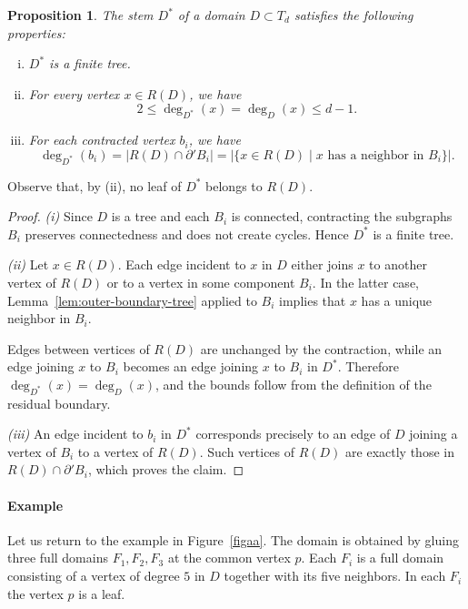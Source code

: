\documentclass[a4paper, 11pt]{article}
\numberwithin{equation}{section}
\newtheorem{proposition}[theorem]{Proposition}
\theoremstyle{definition}
\theoremstyle{remark}
\begin{document}
\begin{proposition}\label{prop.stemproperties}
The stem $D^*$ of a domain $D\subset T_d$ satisfies the following properties:
\begin{enumerate}[(i)]
\item $D^*$ is a finite tree.
\item For every vertex $x\in R(D)$, we have 
\[
   2 \le \deg_{D^*}(x) = \deg_D(x) \le d-1.
\]
\item For each contracted vertex $b_i$,  we have 
\[
   \deg_{D^*}(b_i)  = |R(D)\cap \partial' B_i|
   = \bigl|\{x\in R(D)\mid x \text{ has a neighbor in } B_i\}\bigr|.
\]
\end{enumerate}
\end{proposition}

Observe that, by (ii), no leaf of $D^*$ belongs to $R(D)$. 

\medskip 

\begin{proof}
\emph{(i)} Since $D$ is a tree and each $B_i$ is connected, contracting the
subgraphs $B_i$ preserves connectedness and does not create cycles. Hence $D^*$
is a finite tree.

\smallskip

\emph{(ii)} Let $x\in R(D)$. Each edge incident to $x$ in $D$ either joins $x$ to
another vertex of $R(D)$ or to a vertex in some component $B_i$.
In the latter case, Lemma~\ref{lem:outer-boundary-tree} applied to $B_i$ implies
that $x$ has a unique neighbor in $B_i$.

Edges between vertices of $R(D)$ are unchanged by the contraction, while an edge
joining $x$ to $B_i$ becomes an edge joining $x$ to $B_i$ in $D^*$.
Therefore $\deg_{D^*}(x)=\deg_D(x)$, and the bounds follow from the definition of
the residual boundary.

\smallskip

\emph{(iii)} An edge incident to $b_i$ in $D^*$ corresponds precisely to an edge
of $D$ joining a vertex of $B_i$ to a vertex of $R(D)$.
Such vertices of $R(D)$ are exactly those in $R(D)\cap\partial' B_i$, which proves
the claim.
\end{proof}



\medskip 
 
\paragraph{Example}
Let us return  to  the example in Figure~\ref{figaa}. The domain is obtained by gluing three full domains $F_1,F_2,F_3$ at the common vertex $p$. Each $F_i$ is a full domain consisting of a vertex  of degree $5$ in $D$ together with its five neighbors. In each $F_i$ the vertex $p$ is a leaf.
\end{document}
